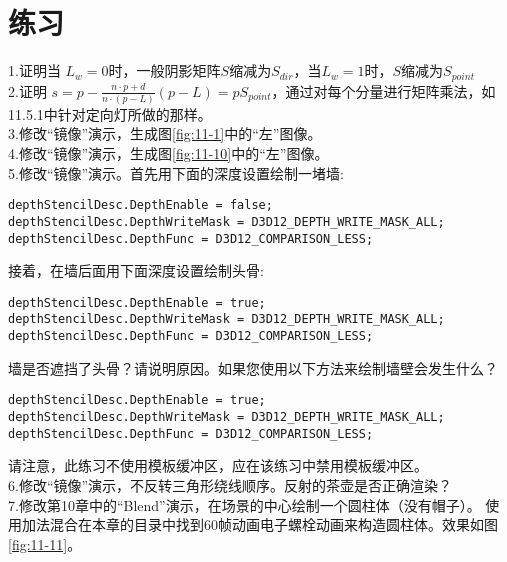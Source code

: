 \section{练习}
\begin{flushleft}
1.证明当 $L_{w}=0$时，一般阴影矩阵$S$缩减为$S_{dir}$，当$L_{w}=1$时，$S$缩减为$S_{point}$\\
2.证明 $s=p-\frac{n\cdot p+d}{n\cdot (p-L)}(p-L)=pS_{point}$，通过对每个分量进行矩阵乘法，如11.5.1中针对定向灯所做的那样。\\
3.修改“镜像”演示，生成图\ref{fig:11-1}中的“左”图像。\\
4.修改“镜像”演示，生成图\ref{fig:11-10}中的“左”图像。\\
5.修改“镜像”演示。首先用下面的深度设置绘制一堵墙:\\
\end{flushleft}

\begin{lstlisting}
depthStencilDesc.DepthEnable = false;
depthStencilDesc.DepthWriteMask = D3D12_DEPTH_WRITE_MASK_ALL;
depthStencilDesc.DepthFunc = D3D12_COMPARISON_LESS;
\end{lstlisting}

\begin{flushleft}
接着，在墙后面用下面深度设置绘制头骨:\\
\end{flushleft}

\begin{lstlisting}
depthStencilDesc.DepthEnable = true;
depthStencilDesc.DepthWriteMask = D3D12_DEPTH_WRITE_MASK_ALL;
depthStencilDesc.DepthFunc = D3D12_COMPARISON_LESS;
\end{lstlisting}

\begin{flushleft}
墙是否遮挡了头骨？请说明原因。如果您使用以下方法来绘制墙壁会发生什么？\\
\end{flushleft}

\begin{lstlisting}
depthStencilDesc.DepthEnable = true;
depthStencilDesc.DepthWriteMask = D3D12_DEPTH_WRITE_MASK_ALL;
depthStencilDesc.DepthFunc = D3D12_COMPARISON_LESS;
\end{lstlisting}

\begin{flushleft}
请注意，此练习不使用模板缓冲区，应在该练习中禁用模板缓冲区。\\

6.修改“镜像”演示，不反转三角形绕线顺序。反射的茶壶是否正确渲染？\\
7.修改第10章中的“Blend”演示，在场景的中心绘制一个圆柱体（没有帽子）。 使用加法混合在本章的目录中找到60帧动画电子螺栓动画来构造圆柱体。效果如图\ref{fig:11-11}。\\
\end{flushleft}

